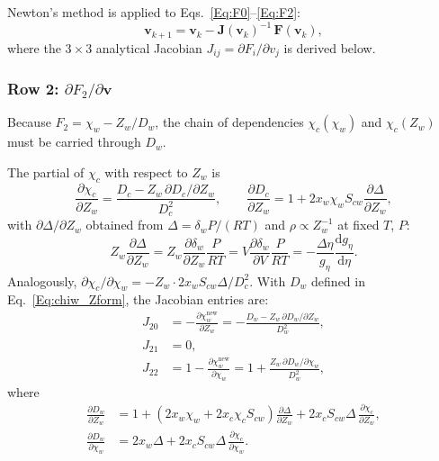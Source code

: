 Newton's method is applied to Eqs.~\eqref{Eq:F0}--\eqref{Eq:F2}:
\begin{equation}
  \mathbf{v}_{k+1} = \mathbf{v}_k - \mathbf{J}(\mathbf{v}_k)^{-1}\,
  \mathbf{F}(\mathbf{v}_k),
  \label{Eq:Newton}
\end{equation}
where the $3\times 3$ analytical Jacobian $J_{ij}=\partial F_i/\partial v_j$ is
derived below.

\subsubsection*{Row 2: $\partial F_2 / \partial \mathbf{v}$}

Because $F_2 = \chi_w - Z_w/D_w$, the chain of dependencies
$\chi_c(\chi_w)$ and $\chi_c(Z_w)$ must be carried through $D_w$.

The partial of $\chi_c$ with respect to $Z_w$ is
\begin{equation}
  \frac{\partial \chi_c}{\partial Z_w} = \frac{D_c - Z_w\,\partial D_c/\partial Z_w}{D_c^2},
  \qquad
  \frac{\partial D_c}{\partial Z_w} = 1 + 2x_w \chi_w S_{cw} \frac{\partial \Delta}{\partial Z_w},
  \label{Eq:dchic_dZw}
\end{equation}
with $\partial\Delta/\partial Z_w$ obtained from $\Delta = \delta_w P/(RT)$ and
$\rho \propto Z_w^{-1}$ at fixed $T$, $P$:
\begin{equation}
  Z_w \frac{\partial \Delta}{\partial Z_w}
  = Z_w \frac{\partial \delta_w}{\partial Z_w}\frac{P}{RT}
  = V\frac{\partial \delta_w}{\partial V}\frac{P}{RT}
  = -\frac{\Delta \eta}{g_\eta}\frac{\mathrm{d}g_\eta}{\mathrm{d}\eta}.
  \label{Eq:dDelta_dZw}
\end{equation}
Analogously, $\partial \chi_c/\partial\chi_w = -Z_w \cdot 2x_w S_{cw}\Delta / D_c^2$.
With $D_w$ defined in Eq.~\eqref{Eq:chiw_Zform}, the Jacobian entries are:
\begin{align}
  J_{20} &= -\frac{\partial \chi_w^{\text{new}}}{\partial Z_w}
    = -\frac{D_w - Z_w\,\partial D_w/\partial Z_w}{D_w^2}, \label{Eq:J20} \\
  J_{21} &= 0, \label{Eq:J21} \\
  J_{22} &= 1 - \frac{\partial \chi_w^{\text{new}}}{\partial \chi_w}
    = 1 + \frac{Z_w\,\partial D_w/\partial \chi_w}{D_w^2}, \label{Eq:J22}
\end{align}
where
\begin{align}
  \frac{\partial D_w}{\partial Z_w} &=
    1 + \left(2x_w\chi_w + 2x_c\chi_c S_{cw}\right)\frac{\partial \Delta}{\partial Z_w}
    + 2x_c S_{cw} \Delta\,\frac{\partial \chi_c}{\partial Z_w}, \\
  \frac{\partial D_w}{\partial \chi_w} &=
    2x_w\Delta + 2x_c S_{cw} \Delta\,\frac{\partial \chi_c}{\partial \chi_w}.
\end{align}

